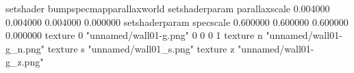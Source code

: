 setshader bumpspecmapparallaxworld
setshaderparam parallaxscale 0.004000 0.004000 0.004000 0.000000
setshaderparam specscale 0.600000 0.600000 0.600000 0.000000
texture 0 "unnamed/wall01-g.png" 0 0 0 1
texture n "unnamed/wall01-g_n.png"
texture s "unnamed/wall01_s.png"
texture z "unnamed/wall01-g_z.png"